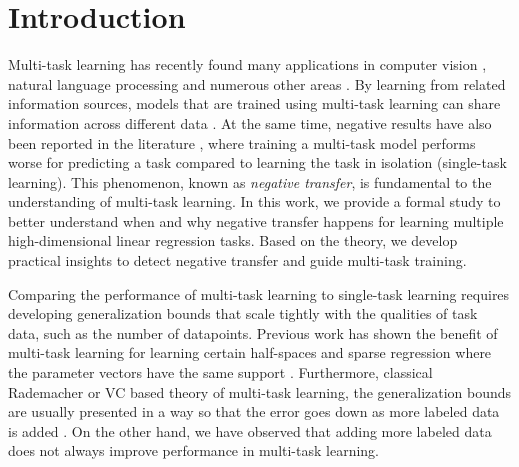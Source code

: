 \section{Introduction}

Multi-task learning has recently found many applications in computer vision \cite{chexnet17,ZSSGM18}, natural language processing \cite{MTDNN19} and numerous other areas \cite{R17,ZY17}.
By learning from related information sources, models that are trained using multi-task learning can share information across different data \cite{C97}.
At the same time, negative results have also been reported in the literature \cite{AP16,BS17}, where training a multi-task model performs worse for predicting a task compared to learning the task in isolation (single-task learning).
This phenomenon, known as \textit{negative transfer}, is fundamental to the understanding of multi-task learning.
In this work, we provide a formal study to better understand when and why negative transfer happens for learning multiple high-dimensional linear regression tasks. %
Based on the theory, we develop practical insights to detect negative transfer and guide multi-task training.

Comparing the performance of multi-task learning to single-task learning requires developing generalization bounds that scale tightly with the qualities of task data, such as the number of datapoints.
Previous work has shown the benefit of multi-task learning for learning certain half-spaces \cite{MPR16} and sparse regression where the parameter vectors have the same support \cite{LPVT11}. 
Furthermore, classical Rademacher or VC based theory of multi-task learning, the generalization bounds are usually presented in a way so that the error goes down as more labeled data is added \cite{M06}.
On the other hand, we have observed that adding more labeled data does not always improve performance in multi-task learning.

